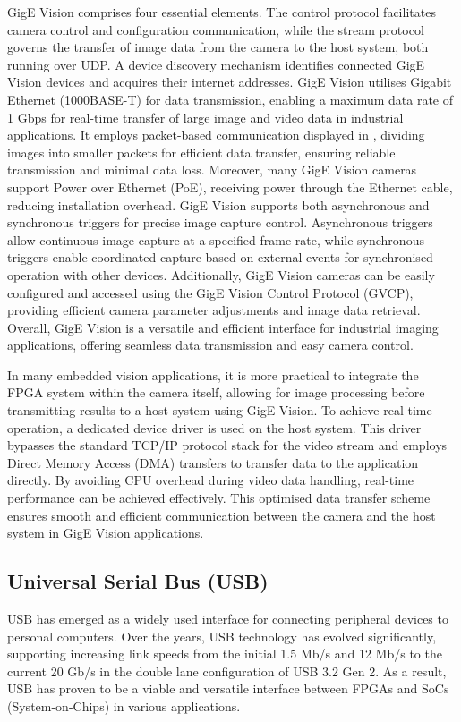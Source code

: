GigE Vision comprises four essential elements. The control protocol facilitates camera control and configuration communication, while the stream protocol governs the transfer of image data from the camera to the host system, both running over UDP. A device discovery mechanism identifies connected GigE Vision devices and acquires their internet addresses. GigE Vision utilises Gigabit Ethernet (1000BASE-T) for data transmission, enabling a maximum data rate of 1 Gbps for real-time transfer of large image and video data in industrial applications. It employs packet-based communication displayed in , dividing images into smaller packets for efficient data transfer, ensuring reliable transmission and minimal data loss. Moreover, many GigE Vision cameras support Power over Ethernet (PoE), receiving power through the Ethernet cable, reducing installation overhead. 
GigE Vision supports both asynchronous and synchronous triggers for precise image capture control. Asynchronous triggers allow continuous image capture at a specified frame rate, while synchronous triggers enable coordinated capture based on external events for synchronised operation with other devices. Additionally, GigE Vision cameras can be easily configured and accessed using the GigE Vision Control Protocol (GVCP), providing efficient camera parameter adjustments and image data retrieval. Overall, GigE Vision is a versatile and efficient interface for industrial imaging applications, offering seamless data transmission and easy camera control.

In many embedded vision applications, it is more practical to integrate the FPGA system within the camera itself, allowing for image processing before transmitting results to a host system using GigE Vision. To achieve real-time operation, a dedicated device driver is used on the host system. This driver bypasses the standard TCP/IP protocol stack for the video stream and employs Direct Memory Access (DMA) transfers to transfer data to the application directly. By avoiding CPU overhead during video data handling, real-time performance can be achieved effectively. This optimised data transfer scheme ensures smooth and efficient communication between the camera and the host system in GigE Vision applications.



\subsection{Universal Serial Bus (USB)}

USB has emerged as a widely used interface for connecting peripheral devices to personal computers. Over the years, USB technology has evolved significantly, supporting increasing link speeds from the initial 1.5 Mb/s and 12 Mb/s to the current 20 Gb/s in the double lane configuration of USB 3.2 Gen 2. As a result, USB has proven to be a viable and versatile interface between FPGAs and SoCs (System-on-Chips) in various applications.

